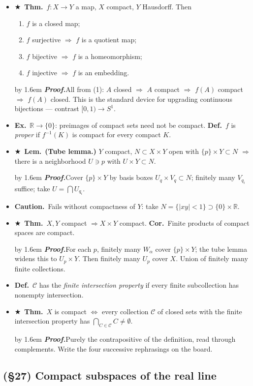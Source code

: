 \documentclass[12pt,a4paper]{article}
\newcommand{\Dfn}{\textbf{Def.}~}
\newcommand{\Thm}{\textbf{Thm.}~}
\newcommand{\Lem}{\textbf{Lem.}~}
\newcommand{\Cor}{\textbf{Cor.}~}
\newcommand{\Exa}{\textbf{Ex.}~}
\newcommand{\Warn}{\textbf{Caution.}~}
\newcommand{\Key}{$\bigstar$~}                  %
\newcommand{\Pf}[1]{%
  \par\addvspace{7pt}\nopagebreak
  \begingroup
    \advance\leftskip by 1.6em
    \parindent=0pt \small\color{prf}%
    \textbf{\textit{Proof.}}\enspace #1\par
  \endgroup
  \addvspace{9pt}}
\newenvironment{BL}%
  {\begin{itemize}[leftmargin=1.4em,labelsep=0.55em,itemsep=11pt,topsep=11pt,parsep=0pt]}%
  {\end{itemize}}
\newenvironment{NL}%
  {\begin{enumerate}[label=(\arabic*),leftmargin=2em,labelsep=0.45em,itemsep=6pt,topsep=7pt,parsep=0pt]}%
  {\end{enumerate}}
\newcommand{\RR}{\mathbb{R}}
\newcommand{\cC}{\mathcal{C}}
\renewcommand{\iff}{\Leftrightarrow}
\newcommand{\imp}{\Rightarrow}
\begin{document}
\begin{BL}
\item \Key\Thm $f\colon X\to Y$ a map, $X$ compact, $Y$ Hausdorff. Then
  \begin{NL}
  \item $f$ is a closed map;
  \item $f$ surjective $\imp$ $f$ is a quotient map;
  \item $f$ bijective $\imp$ $f$ is a homeomorphism;
  \item $f$ injective $\imp$ $f$ is an embedding.
  \end{NL}
\Pf{All from (1): $A$ closed $\imp$ $A$ compact $\imp$ $f(A)$ compact $\imp$ $f(A)$ closed.
This is the standard device for upgrading continuous bijections --- contrast $[0,1)\to S^1$.}
\item \Exa $\RR\to\{0\}$: preimages of compact sets need not be compact.
      \Dfn $f$ is \emph{proper} if $f^{-1}(K)$ is compact for every compact $K$.
\item \Key\Lem \textbf{(Tube lemma.)} $Y$ compact, $N\subset X\times Y$ open with
      $\{p\}\times Y\subset N$ $\imp$ there is a neighborhood $U\ni p$ with $U\times Y\subset N$.
\Pf{Cover $\{p\}\times Y$ by basis boxes $U_q\times V_q\subset N$; finitely many $V_{q_i}$
suffice; take $U=\bigcap U_{q_i}$.}
\item \Warn Fails without compactness of $Y$: take $N=\{|xy|<1\}\supset\{0\}\times\RR$.
\item \Key\Thm $X,Y$ compact $\imp X\times Y$ compact. \Cor Finite products of compact spaces
      are compact.
\Pf{For each $p$, finitely many $W_\alpha$ cover $\{p\}\times Y$; the tube lemma widens this to
$U_p\times Y$. Then finitely many $U_p$ cover $X$. Union of finitely many finite collections.}
\item \Dfn $\cC$ has the \emph{finite intersection property} if every finite subcollection has
      nonempty intersection.
\item \Key\Thm $X$ is compact $\iff$ every collection $\cC$ of closed sets with the finite
      intersection property has $\bigcap_{C\in\cC}C\neq\emptyset$.
\Pf{Purely the contrapositive of the definition, read through complements. Write the four
successive rephrasings on the board.}
\end{BL}

\subsection{(\S27) Compact subspaces of the real line}
\end{document}
